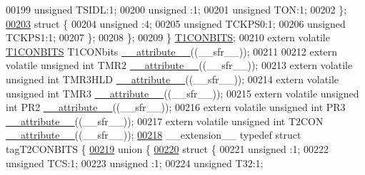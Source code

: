 \begin{DoxyCode}
00199       \textcolor{keywordtype}{unsigned} TSIDL:1;
00200       \textcolor{keywordtype}{unsigned} :1;
00201       \textcolor{keywordtype}{unsigned} TON:1;
00202     \};
\hypertarget{a00015_source_l00203}{}\hyperlink{a00015}{00203}     \textcolor{keyword}{struct }\{
00204       \textcolor{keywordtype}{unsigned} :4;
00205       \textcolor{keywordtype}{unsigned} TCKPS0:1;
00206       \textcolor{keywordtype}{unsigned} TCKPS1:1;
00207     \};
00208   \};
00209 \} \hyperlink{a00014_d5/d12/a00794}{T1CONBITS};
00210 \textcolor{keyword}{extern} \textcolor{keyword}{volatile} \hyperlink{a00014_d5/d12/a00794}{T1CONBITS} T1CONbits \hyperlink{a00015_a493c46f03454991ccc5aa7a6e1dfb2a7}{\_\_attribute\_\_}((\_\_sfr\_\_));
00211 
00212 \textcolor{keyword}{extern} \textcolor{keyword}{volatile} \textcolor{keywordtype}{unsigned} \textcolor{keywordtype}{int}  TMR2 \hyperlink{a00015_a493c46f03454991ccc5aa7a6e1dfb2a7}{\_\_attribute\_\_}((\_\_sfr\_\_));
00213 \textcolor{keyword}{extern} \textcolor{keyword}{volatile} \textcolor{keywordtype}{unsigned} \textcolor{keywordtype}{int}  TMR3HLD \hyperlink{a00015_a493c46f03454991ccc5aa7a6e1dfb2a7}{\_\_attribute\_\_}((\_\_sfr\_\_));
00214 \textcolor{keyword}{extern} \textcolor{keyword}{volatile} \textcolor{keywordtype}{unsigned} \textcolor{keywordtype}{int}  TMR3 \hyperlink{a00015_a493c46f03454991ccc5aa7a6e1dfb2a7}{\_\_attribute\_\_}((\_\_sfr\_\_));
00215 \textcolor{keyword}{extern} \textcolor{keyword}{volatile} \textcolor{keywordtype}{unsigned} \textcolor{keywordtype}{int}  PR2 \hyperlink{a00015_a493c46f03454991ccc5aa7a6e1dfb2a7}{\_\_attribute\_\_}((\_\_sfr\_\_));
00216 \textcolor{keyword}{extern} \textcolor{keyword}{volatile} \textcolor{keywordtype}{unsigned} \textcolor{keywordtype}{int}  PR3 \hyperlink{a00015_a493c46f03454991ccc5aa7a6e1dfb2a7}{\_\_attribute\_\_}((\_\_sfr\_\_));
00217 \textcolor{keyword}{extern} \textcolor{keyword}{volatile} \textcolor{keywordtype}{unsigned} \textcolor{keywordtype}{int}  T2CON \hyperlink{a00015_a493c46f03454991ccc5aa7a6e1dfb2a7}{\_\_attribute\_\_}((\_\_sfr\_\_));
\hypertarget{a00015_source_l00218}{}\hyperlink{a00014}{00218} \_\_extension\_\_ \textcolor{keyword}{typedef} \textcolor{keyword}{struct }tagT2CONBITS \{
\hypertarget{a00015_source_l00219}{}\hyperlink{a00015}{00219}   \textcolor{keyword}{union }\{
\hypertarget{a00015_source_l00220}{}\hyperlink{a00015}{00220}     \textcolor{keyword}{struct }\{
00221       \textcolor{keywordtype}{unsigned} :1;
00222       \textcolor{keywordtype}{unsigned} TCS:1;
00223       \textcolor{keywordtype}{unsigned} :1;
00224       \textcolor{keywordtype}{unsigned} T32:1;

\end{DoxyCode}
